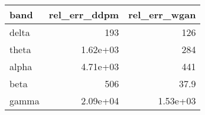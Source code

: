 \begin{tabular}{lrr}
\toprule
band & rel_err_ddpm & rel_err_wgan \\
\midrule
delta & 193 & 126 \\
theta & 1.62e+03 & 284 \\
alpha & 4.71e+03 & 441 \\
beta & 506 & 37.9 \\
gamma & 2.09e+04 & 1.53e+03 \\
\bottomrule
\end{tabular}
